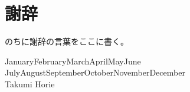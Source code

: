   \newcommand{\fulltoday}{\number\day\space \ifcase\month\or
    January\or February\or March\or April\or May\or June\or
    July\or August\or September\or October\or November\or December\fi
    \space\number\year}

\chapter*{謝辞}
のちに謝辞の言葉をここに書く。

\begin{flushright}
\fulltoday\\
Takumi Horie
\end{flushright}
